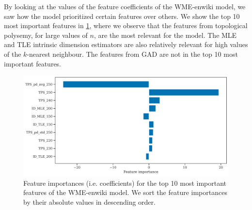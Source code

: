 By looking at the values of the feature coefficients of the WME-enwiki model, we saw how the model prioritized certain features over others. We show the top 10 most important features in \cref{fig:wme-enwiki-feature-importances}, where we observe that the features from topological polysemy, for large values of $n$, are the most relevant for the model. The MLE and TLE intrinsic dimension estimators are also relatively relevant for high values of the $k$-nearest neighbour. The features from GAD are not in the top 10 most important features.
\begin{figure}[H]
    \centering
    \includegraphics[width=\textwidth]{thesis/figures/wme-enwiki-top-10-feature-importances.pdf}
    \caption{Feature importances (i.e. coefficients) for the top 10 most important features of the WME-enwiki model. We sort the feature importances by their absolute values in descending order.}
    \label{fig:wme-enwiki-feature-importances}
\end{figure}

